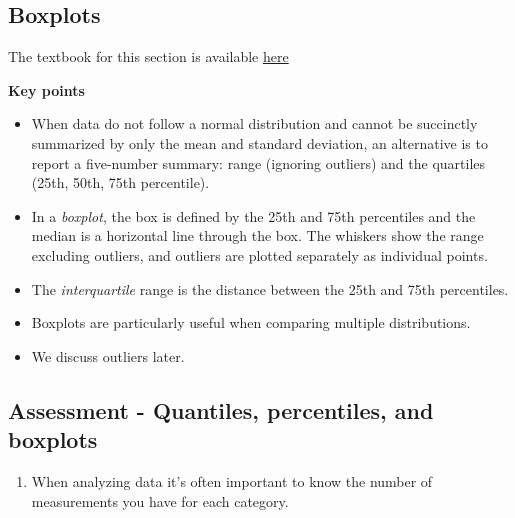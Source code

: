 \documentclass[
]{article}
\newenvironment{Shaded}{\begin{snugshade}}{\end{snugshade}}
\newcommand{\KeywordTok}[1]{\textcolor[rgb]{0.13,0.29,0.53}{\textbf{#1}}}
\newcommand{\NormalTok}[1]{#1}
\newcommand{\OperatorTok}[1]{\textcolor[rgb]{0.81,0.36,0.00}{\textbf{#1}}}
\newcommand{\StringTok}[1]{\textcolor[rgb]{0.31,0.60,0.02}{#1}}
\providecommand{\tightlist}{%
  \setlength{\itemsep}{0pt}\setlength{\parskip}{0pt}}
\begin{document}
\hypertarget{boxplots}{%
\subsection{Boxplots}\label{boxplots}}

The textbook for this section is available
\href{https://rafalab.github.io/dsbook/distributions.html\#boxplots}{here}

\textbf{Key points}

\begin{itemize}
\tightlist
\item
  When data do not follow a normal distribution and cannot be succinctly
  summarized by only the mean and standard deviation, an alternative is
  to report a five-number summary: range (ignoring outliers) and the
  quartiles (25th, 50th, 75th percentile).
\item
  In a \emph{boxplot}, the box is defined by the 25th and 75th
  percentiles and the median is a horizontal line through the box. The
  whiskers show the range excluding outliers, and outliers are plotted
  separately as individual points.
\item
  The \emph{interquartile} range is the distance between the 25th and
  75th percentiles.
\item
  Boxplots are particularly useful when comparing multiple
  distributions.
\item
  We discuss outliers later.
\end{itemize}

\hypertarget{assessment---quantiles-percentiles-and-boxplots}{%
\subsection{Assessment - Quantiles, percentiles, and
boxplots}\label{assessment---quantiles-percentiles-and-boxplots}}

\begin{enumerate}
\def\labelenumi{\arabic{enumi}.}
\tightlist
\item
  When analyzing data it's often important to know the number of
  measurements you have for each category.
\end{enumerate}

\begin{Shaded}
\end{Shaded}
\end{document}
